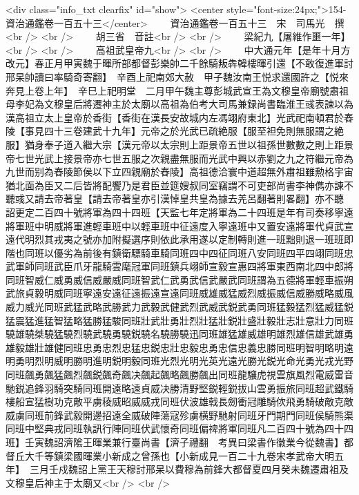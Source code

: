 <div class="info_txt clearfix" id="show">
<center style="font-size:24px;">154-資治通鑑卷一百五十三</center>
  　　資治通鑑卷一百五十三　宋　司馬光　撰<br />
<br />
　　胡三省　音註<br />
<br />
　　梁紀九【屠維作噩一年】<br />
<br />
　　高祖武皇帝九<br />
<br />
　　中大通元年【是年十月方改元】春正月甲寅魏于暉所部都督彭樂帥二千餘騎叛犇韓樓暉引還【不敢復進軍討邢杲帥讀曰率騎奇寄翻】　辛酉上祀南郊大赦　甲子魏汝南王悦求還國許之【悦來奔見上卷上年】　辛巳上祀明堂　二月甲午魏主尊彭城武宣王為文穆皇帝廟號肅祖母李妃為文穆皇后將遷神主於太廟以高祖為伯考大司馬兼録尚書臨淮王彧表諫以為漢高祖立太上皇帝於香街【香街在漢長安故城内左馮翊府東北】光武祀南頓君於舂陵【事見四十三卷建武十九年】元帝之於光武已疏絶服【服至袒免則無服謂之絶服】猶身奉子道入繼大宗【漢元帝以太宗則上距景帝五世以祖孫世數數之則上距景帝七世光武上接景帝亦七世五服之次親盡無服而光武中興以赤劉之九之符繼元帝為九世而别為舂陵節侯以下立四親廟於舂陵】高祖德洽寰中道超無外肅祖雖勲格宇宙猶北面為臣又二后皆將配饗乃是君臣並筵嫂叔同室竊謂不可吏部尚書李神儁亦諫不聽彧又請去帝著皇【請去帝著皇亦引漢悼皇共皇為據去羌呂翻著則畧翻】亦不聽　詔更定二百四十號將軍為四十四班【天監七年定將軍為二十四班是年有司奏移寧遠將軍班中明威將軍進輕車班中以輕車班中征遠度入寧遠班中又置安遠將軍代貞武宣遠代明烈其戎夷之號亦加附擬選序則依此承用遂以定制轉則進一班黜則退一班班即階也同班以優劣為前後有鎮衛驃騎車騎同班四中四征同班八安同班四平四翊同班忠武軍師同班武臣爪牙龍騎雲麾冠軍同班鎮兵翊師宣毅宣惠四將軍東西南北四中郎將同班智威仁威勇威信威嚴威同班智武仁武勇武信武嚴武同班謂為五德將軍輕車振朔武旅貞毅明威同班寧遠安遠征遠振遠宣遠同班威雄威猛威烈威振威信威勝威略威風威力威光同班武猛武略武勝武力武毅武健武烈武威武鋭武勇同班猛毅猛烈猛威猛鋭猛震猛進猛智猛略猛勝猛駿同班壯武壯勇壯烈壯猛壯鋭壯盛壯毅壯志壯意壯力同班驍雄驍桀驍猛驍烈驍武驍勇驍鋭驍名驍勝驍迅同班雄猛雄威雄明雄烈雄信雄武雄勇雄毅雄壯雄健同班忠勇忠烈忠猛忠鋭忠壯忠毅忠勇忠信忠義忠勝同班明智明略明遠明勇明烈明威明勝明進明鋭明毅同班光烈光明光英光遠光勝光鋭光命光勇光戎光野同班飆勇飆猛飆烈飆鋭飆奇飆决飆起飆略飆勝飆出同班龍驤虎視雲旗風烈電威雷音馳鋭追鋒羽騎突騎同班開遠略遠貞威决勝清野堅鋭輕鋭拔山雲勇振旅同班超武鐵騎樓船宣猛樹功克敵平虜稜威昭威威戎同班伏波雄戟長劒衝冠雕騎佽飛勇騎破敵克敵威虜同班前鋒武毅開邊招遠全威破陣蕩寇殄虜横野馳射同班牙門期門同班侯騎熊渠同班中堅典戎同班執訊行陣同班伏武懷奇同班偏禆將軍同班凡二百四十號為四十四班】壬寅魏詔濟隂王暉業兼行臺尚書【濟子禮翻　考異曰梁書作徽業今從魏書】都督丘大千等鎮梁國暉業小新成之曾孫也【小新成見一百二十九卷宋孝武帝大明五年】　三月壬戍魏詔上黨王天穆討邢杲以費穆為前鋒大都督夏四月癸未魏遷肅祖及文穆皇后神主于太廟又<br />
<br />
